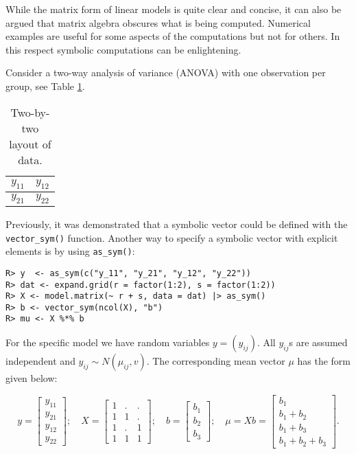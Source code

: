 While the matrix form of linear models is quite clear and concise,
it can also be argued that matrix algebra
obscures what is being computed. Numerical examples are useful for
some aspects of the computations but not for others. In this respect
symbolic computations can be enlightening.

Consider a two-way analysis of variance (ANOVA) with one observation
per group, see Table \ref{tab:anova-two-way-table}.

\begin{table}[!h]

\caption{\label{tab:anova-two-way-table}Two-by-two layout of data.}
\centering
\begin{tabular}[t]{|>{}l|>{}l|}
\hline
$y_{11}$ & $y_{12}$\\
\hline
$y_{21}$ & $y_{22}$\\
\hline
\end{tabular}
\end{table}

Previously, it was demonstrated that a symbolic
vector could be defined with the \texttt{vector\_sym()} function.
Another way to specify a symbolic vector with explicit elements is
by using \texttt{as\_sym()}:

\begin{verbatim}
R> y  <- as_sym(c("y_11", "y_21", "y_12", "y_22"))
R> dat <- expand.grid(r = factor(1:2), s = factor(1:2))
R> X <- model.matrix(~ r + s, data = dat) |> as_sym()
R> b <- vector_sym(ncol(X), "b")
R> mu <- X %*% b
\end{verbatim}

For the specific model we have random variables \(y=(y_{ij})\). All
\(y_{ij}\)s are assumed independent and \(y_{ij}\sim N(\mu_{ij}, v)\).
The corresponding mean vector \(\mu\) has the form given below:

\begin{equation}
y = \left[\begin{matrix}y_{11}\\y_{21}\\y_{12}\\y_{22}\end{matrix}\right]; \quad X=\left[\begin{matrix}1 & . & .\\1 & 1 & .\\1 & . & 1\\1 & 1 & 1\end{matrix}\right]; \quad b=\left[\begin{matrix}b_{1}\\b_{2}\\b_{3}\end{matrix}\right]; \quad  \mu = X b = \left[\begin{matrix}b_{1}\\b_{1} + b_{2}\\b_{1} + b_{3}\\b_{1} + b_{2} + b_{3}\end{matrix}\right] .
\end{equation}

